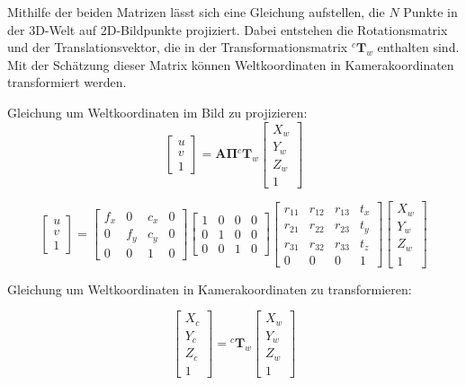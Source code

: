 Mithilfe der beiden Matrizen lässt sich eine Gleichung aufstellen, die \( N \) Punkte 
in der 3D-Welt auf 2D-Bildpunkte projiziert. Dabei entstehen die Rotationsmatrix und der 
Translationsvektor, die in der Transformationsmatrix \({}^{c}\mathbf{T}_{w}\) enthalten sind.
Mit der Schätzung dieser Matrix können Weltkoordinaten in Kamerakoordinaten transformiert 
werden.

Gleichung um Weltkoordinaten im Bild zu projizieren:
\[
\begin{bmatrix}
u \\ 
v \\ 
1
\end{bmatrix}
=
\mathbf{A} \mathbf{\Pi} {}^{c}\mathbf{T}_{w}
\begin{bmatrix}
X_w \\ 
Y_w \\ 
Z_w \\ 
1
\end{bmatrix}
\]

\[
\begin{bmatrix}
u \\ 
v \\ 
1
\end{bmatrix}
=
\begin{bmatrix}
f_x & 0   & c_x & 0 \\ 
0   & f_y & c_y & 0 \\ 
0   & 0   & 1   & 0
\end{bmatrix}
\begin{bmatrix}
1 & 0 & 0 & 0 \\ 
0 & 1 & 0 & 0 \\ 
0 & 0 & 1 & 0
\end{bmatrix}
\begin{bmatrix}
r_{11} & r_{12} & r_{13} & t_x \\ 
r_{21} & r_{22} & r_{23} & t_y \\ 
r_{31} & r_{32} & r_{33} & t_z \\ 
0      & 0      & 0      & 1
\end{bmatrix}
\begin{bmatrix}
X_w \\ 
Y_w \\ 
Z_w \\ 
1
\end{bmatrix}
\]

Gleichung um Weltkoordinaten in Kamerakoordinaten zu transformieren:

\[
\begin{bmatrix}
X_c \\ 
Y_c \\ 
Z_c \\ 
1
\end{bmatrix}
=
{}^{c}\mathbf{T}_{w}
\begin{bmatrix}
X_w \\ 
Y_w \\ 
Z_w \\ 
1
\end{bmatrix}
\]

